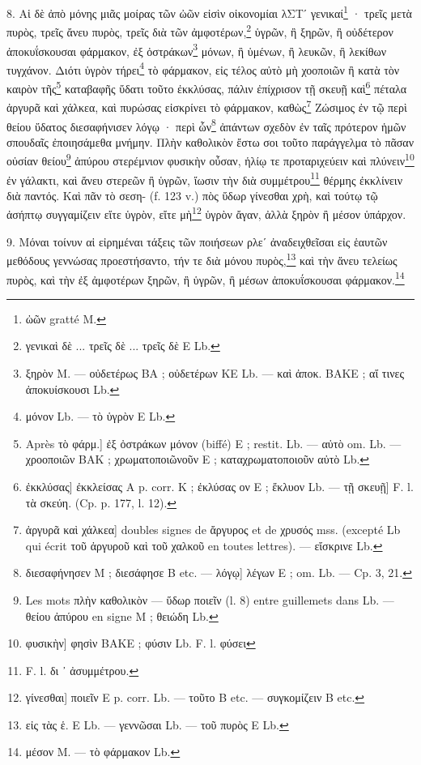\documentclass[a4paper, 11pt, oneside, polutonikogreek, french]{article}
\begin{document}
8. Αἱ δὲ ἀπὸ μόνης μιᾶς μοίρας τῶν ὠῶν εἰσὶν οἰκονομίαι λΣΤʹ γενικαί\footnote{ὠῶν gratté M.} · τρεῖς μετὰ πυρὸς, τρεῖς ἄνευ πυρὸς, τρεῖς διὰ τῶν ἀμφοτέρων,\footnote{γενικαὶ δὲ ... τρεῖς δὲ ... τρεῖς δὲ E Lb.} ὑγρῶν, ἢ ξηρῶν, ἢ οὐδέτερον ἀποκυΐσκουσαι φάρμακον, ἐξ ὀστράκων\footnote{ξηρὸν M. --- οὐδετέρως BA ; οὐδετέρων KE Lb. --- καὶ ἀποκ. BAKE ; αἵ τινες ἀποκυίσκουσι Lb.} μόνων, ἢ ὑμένων, ἢ λευκῶν, ἢ λεκίθων τυγχάνον. Διότι ὑγρὸν τήρει\footnote{μόνον Lb. --- τὸ ὑγρὸν E Lb.} τὸ φάρμακον, εἰς τέλος αὐτὸ μὴ χοοποιῶν ἢ κατὰ τὸν καιρὸν τῆς\footnote{Après τὸ φάρμ.] ἐξ ὀστράκων μόνον (biffé) E ; restit. Lb. --- αὐτὸ om. Lb. --- χροοποιῶν BAK ; χρωματοποιῶνοῦν E ; καταχρωματοποιοῦν αὐτὸ Lb.} καταβαφῆς ὕδατι τοῦτο ἐκκλύσας, πάλιν ἐπίχρισον τῇ σκευῇ καὶ\footnote{ἐκκλύσας] ἐκκλείσας A p. corr. K ; ἐκλύσας ον E ; ἔκλυον Lb. --- τῇ σκευῇ] F. l. τὰ σκεύη. (Cp. p. 177, l. 12).} πέταλα ἀργυρᾶ καὶ χάλκεα, καὶ πυρώσας εἰσκρίνει τὸ φάρμακον, καθὼς\footnote{ἀργυρᾶ καὶ χάλκεα] doubles signes de ἄργυρος et de χρυσός mss. (excepté Lb qui écrit τοῦ ἀργυροῦ καὶ τοῦ χαλκοῦ en toutes lettres). --- εἴσκρινε Lb.} Ζώσιμος ἐν τῷ περὶ θείου ὕδατος διεσαφήνισεν λόγῳ · περὶ ὧν\footnote{διεσαφήνησεν M ; διεσάφησε B etc. --- λόγῳ] λέγων E ; om. Lb. --- Cp. 3, 21.} ἀπάντων σχεδὸν ἐν ταῖς πρότερον ἡμῶν σπουδαῖς ἐποιησάμεθα μνήμην. Πλὴν καθολικὸν ἔστω σοι τοῦτο παράγγελμα τὸ πᾶσαν οὐσίαν θείου\footnote{Les mots πλὴν καθολικὸν --- ὕδωρ ποιεῖν (l. 8) entre guillemets dans Lb. --- θείου ἀπύρου en signe M ; θειώδη Lb.} ἀπύρου στερέμνιον φυσικὴν οὖσαν, ἡλίῳ τε προταριχεύειν καὶ πλύνειν\footnote{φυσικὴν] φησὶν BAKE ; φύσιν Lb. F. l. φύσει} ἐν γάλακτι, καὶ ἄνευ στερεῶν ἢ ὑγρῶν, ἴωσιν τὴν διὰ συμμέτρου\footnote{F. l. δι ᾽ ἀσυμμέτρου.} θέρμης ἐκκλίνειν διὰ παντός. Καὶ πᾶν τὸ σεση- (f. 123 v.) πὸς ὕδωρ γίνεσθαι χρὴ, καὶ τούτῳ τῷ ἀσήπτῳ συγγαμίζειν εἴτε ὑγρὸν, εἴτε μὴ\footnote{γίνεσθαι] ποιεῖν E p. corr. Lb. --- τοῦτο B etc. --- συγκομίζειν B etc.} ὑγρὸν ἄγαν, ἀλλὰ ξηρὸν ἢ μέσον ὑπάρχον.

9. Μόναι τοίνυν αἱ εἰρημέναι τάξεις τῶν ποιήσεων ρλεʹ ἀναδειχθεῖσαι εἰς ἑαυτῶν μεθόδους γεννώσας προεστήσαντο, τήν τε διὰ μόνου πυρὸς,\footnote{εἰς τὰς ἑ. E Lb. --- γεννῶσαι Lb. --- τοῦ πυρὸς E Lb.} καὶ τὴν ἄνευ τελείως πυρὸς, καὶ τὴν ἐξ ἀμφοτέρων ξηρῶν, ἢ ὑγρῶν, ἢ μέσων ἀποκυΐσκουσαι φάρμακον.\footnote{μέσον M. --- τὸ φάρμακον Lb.}
\end{document}
